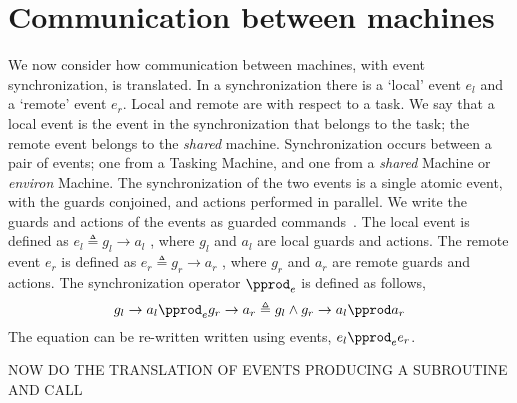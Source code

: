\section{Communication between machines}\label{synching}
We now consider how communication between machines, with event synchronization, is translated. In a synchronization there is a ‘local’ event $e_l$ and a ‘remote’ event $e_r$. Local and remote are with respect to a task. We say that a local event is the event in the synchronization that belongs to the task; the remote event belongs to the \emph{shared} machine. Synchronization occurs between a pair of events; one from a Tasking Machine, and one from a \emph{shared} Machine or \emph{environ} Machine. The synchronization of the two events is a single atomic event, with the guards conjoined,  and actions performed in parallel. We write the guards and actions of the events as guarded commands~\cite{Dijkstra75a}. The local event is defined as  $e_l \triangleq g_l \rightarrow a_l$ , where $g_l$ and $a_l$ are local guards and actions. The remote event $e_r$ is defined as $e_r \triangleq g_r \rightarrow a_r$ , where $g_r$ and $a_r$ are remote guards and actions. The synchronization operator $\pprod_e$ is defined as follows, 
%
\begin{equation}
g_l \rightarrow a_l \pprod_e g_r \rightarrow a_r \triangleq g_l \land g_r \rightarrow a_l \pprod a_r
\notag
\end{equation}
%
The equation can be re-written written using events, $e_l \pprod_e e_r$.

NOW DO THE TRANSLATION OF EVENTS PRODUCING A SUBROUTINE AND CALL


%
